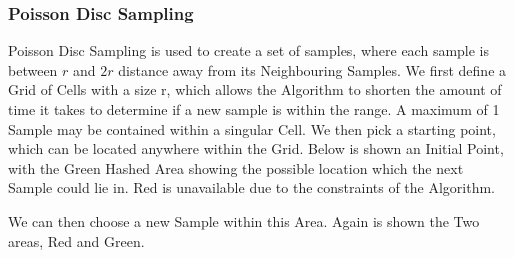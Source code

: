 \begin{flushleft}
            \subsubsection{Poisson Disc Sampling}
                Poisson Disc Sampling is used to create a set of samples, where each sample is between $r$ and $2r$ distance away
                from its Neighbouring Samples. We first define a Grid of Cells with a size r, which allows the Algorithm to shorten the amount of 
                time it takes to determine if a new sample is within the range. A maximum of 1 Sample may be contained within a singular Cell. 
                We then pick a starting point, which can be located anywhere within the Grid. Below is shown an Initial Point, with the Green 
                Hashed Area showing the possible location which the next Sample could lie in. Red is unavailable due to the constraints of the Algorithm.

                \begin{center}
                \end{center}

                We can then choose a new Sample within this Area. Again is shown the Two areas, Red and Green.


\end{flushleft}
